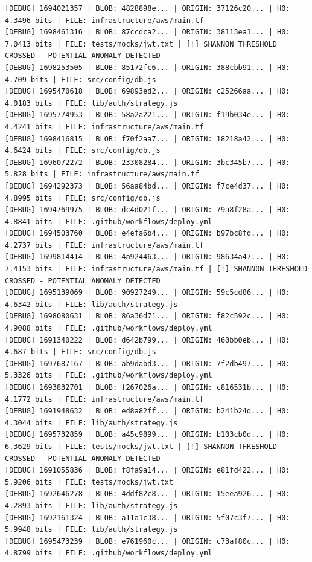 \documentclass[12pt, a4paper, oneside]{report}
\begin{document}
\begin{lstlisting}[basicstyle=\tiny\ttfamily]
[DEBUG] 1694021357 | BLOB: 4828898e... | ORIGIN: 37126c20... | H0: 4.3496 bits | FILE: infrastructure/aws/main.tf
[DEBUG] 1698461316 | BLOB: 87ccdca2... | ORIGIN: 38113ea1... | H0: 7.0413 bits | FILE: tests/mocks/jwt.txt | [!] SHANNON THRESHOLD CROSSED - POTENTIAL ANOMALY DETECTED
[DEBUG] 1698253505 | BLOB: 85172fc6... | ORIGIN: 388cbb91... | H0: 4.709 bits | FILE: src/config/db.js
[DEBUG] 1695470618 | BLOB: 69893ed2... | ORIGIN: c25266aa... | H0: 4.0183 bits | FILE: lib/auth/strategy.js
[DEBUG] 1695774953 | BLOB: 58a2a221... | ORIGIN: f19b034e... | H0: 4.4241 bits | FILE: infrastructure/aws/main.tf
[DEBUG] 1698416815 | BLOB: f70f2aa7... | ORIGIN: 18218a42... | H0: 4.6424 bits | FILE: src/config/db.js
[DEBUG] 1696072272 | BLOB: 23308284... | ORIGIN: 3bc345b7... | H0: 5.828 bits | FILE: infrastructure/aws/main.tf
[DEBUG] 1694292373 | BLOB: 56aa84bd... | ORIGIN: f7ce4d37... | H0: 4.8995 bits | FILE: src/config/db.js
[DEBUG] 1694769975 | BLOB: dc4d021f... | ORIGIN: 79a8f28a... | H0: 4.8841 bits | FILE: .github/workflows/deploy.yml
[DEBUG] 1694503760 | BLOB: e4efa6b4... | ORIGIN: b97bc8fd... | H0: 4.2737 bits | FILE: infrastructure/aws/main.tf
[DEBUG] 1699814414 | BLOB: 4a924463... | ORIGIN: 98634a47... | H0: 7.4153 bits | FILE: infrastructure/aws/main.tf | [!] SHANNON THRESHOLD CROSSED - POTENTIAL ANOMALY DETECTED
[DEBUG] 1695139069 | BLOB: 90927249... | ORIGIN: 59c5cd86... | H0: 4.6342 bits | FILE: lib/auth/strategy.js
[DEBUG] 1698080631 | BLOB: 86a36d71... | ORIGIN: f82c592c... | H0: 4.9088 bits | FILE: .github/workflows/deploy.yml
[DEBUG] 1691340222 | BLOB: d642b799... | ORIGIN: 460bb0eb... | H0: 4.687 bits | FILE: src/config/db.js
[DEBUG] 1697687167 | BLOB: ab9dabd3... | ORIGIN: 7f2db497... | H0: 5.3326 bits | FILE: .github/workflows/deploy.yml
[DEBUG] 1693832701 | BLOB: f267026a... | ORIGIN: c816531b... | H0: 4.1772 bits | FILE: infrastructure/aws/main.tf
[DEBUG] 1691948632 | BLOB: ed8a82ff... | ORIGIN: b241b24d... | H0: 4.3044 bits | FILE: lib/auth/strategy.js
[DEBUG] 1695732859 | BLOB: a45c9899... | ORIGIN: b103cb0d... | H0: 6.3629 bits | FILE: tests/mocks/jwt.txt | [!] SHANNON THRESHOLD CROSSED - POTENTIAL ANOMALY DETECTED
[DEBUG] 1691055836 | BLOB: f8fa9a14... | ORIGIN: e81fd422... | H0: 5.9206 bits | FILE: tests/mocks/jwt.txt
[DEBUG] 1692646278 | BLOB: 4ddf82c8... | ORIGIN: 15eea926... | H0: 4.2893 bits | FILE: lib/auth/strategy.js
[DEBUG] 1692161324 | BLOB: a11a1c38... | ORIGIN: 5f07c3f7... | H0: 5.9948 bits | FILE: lib/auth/strategy.js
[DEBUG] 1695473239 | BLOB: e761960c... | ORIGIN: c73af80c... | H0: 4.8799 bits | FILE: .github/workflows/deploy.yml

\end{lstlisting}
\end{document}

